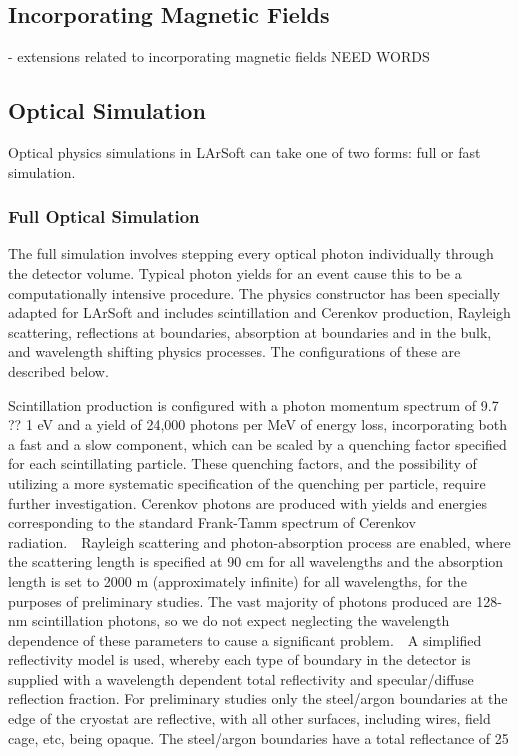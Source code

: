 \documentclass[12pt]{elsarticle}
\begin{document}
\subsection{Incorporating Magnetic Fields}
- extensions related to incorporating magnetic fields
NEED WORDS
\subsection{Optical Simulation}
Optical physics simulations in LArSoft can take one of two forms: full or fast 
simulation.  
\subsubsection{Full Optical Simulation}
The full simulation involves stepping every optical photon individually through the detector volume.  Typical photon yields for an event cause this to be a computationally intensive procedure. The physics constructor has been specially adapted for LArSoft and includes scintillation and Cerenkov production, Rayleigh scattering, reflections at boundaries, absorption at boundaries and in the bulk, and wavelength shifting physics processes.  The configurations of these are described below.

Scintillation production is configured with a photon momentum spectrum of 9.7 ?? 1 eV and a yield of 24,000 photons per MeV of energy loss, incorporating both a fast and a slow component, which can be scaled by a quenching factor specified for each scintillating particle.  These quenching factors, and the possibility of utilizing a more systematic specification of the quenching per particle, require further investigation. Cerenkov photons are produced with yields and energies corresponding to the standard Frank-Tamm spectrum of Cerenkov radiation.\
\
Rayleigh scattering and photon-absorption process are enabled, where the scattering length is specified at 90 cm for all wavelengths and the absorption length is set to 2000 m (approximately infinite) for all wavelengths, for the purposes of preliminary studies.  The vast majority of photons produced are 128-nm scintillation photons, so we do not expect neglecting the wavelength dependence of these parameters to cause a significant problem.\
\
A simplified reflectivity model is used, whereby each type of boundary in the detector is supplied with a wavelength dependent total reflectivity and specular/diffuse reflection fraction.   For  preliminary  studies  only the  steel/argon boundaries  at  the  edge of the cryostat are  reflective,  with  all  other  surfaces,  including  wires,  field cage,  etc,  being opaque.   The steel/argon boundaries have a total reflectance of 25%
\end{document}
